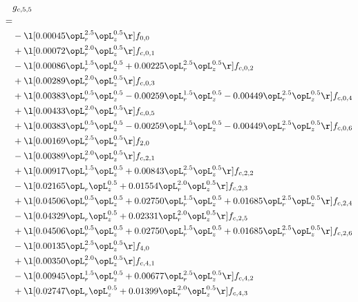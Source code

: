 \begin{alignat}{2} 
\label{eq:g_55_0} 
& g_{c,5,5} \nonumber \\ 
 = \\ 
& - \l[  0.00045 \opL_r^{2.5} \opL_z^{0.5}  \r] f_{0,0} \nonumber \\ 
& + \l[  0.00072 \opL_r^{2.0} \opL_z^{0.5}  \r] f_{c,0,1} \nonumber \\ 
& - \l[  0.00086 \opL_r^{1.5} \opL_z^{0.5} +  0.00225 \opL_r^{2.5} \opL_z^{0.5}  \r] f_{c,0,2} \nonumber \\ 
& + \l[  0.00289 \opL_r^{2.0} \opL_z^{0.5}  \r] f_{c,0,3} \nonumber \\ 
& + \l[  0.00383 \opL_r^{0.5} \opL_z^{0.5}   -0.00259 \opL_r^{1.5} \opL_z^{0.5}   -0.00449 \opL_r^{2.5} \opL_z^{0.5}  \r] f_{c,0,4} \nonumber \\ 
& + \l[  0.00433 \opL_r^{2.0} \opL_z^{0.5}  \r] f_{c,0,5} \nonumber \\ 
& + \l[  0.00383 \opL_r^{0.5} \opL_z^{0.5}   -0.00259 \opL_r^{1.5} \opL_z^{0.5}   -0.00449 \opL_r^{2.5} \opL_z^{0.5}  \r] f_{c,0,6} \nonumber \\ 
& + \l[  0.00169 \opL_r^{2.5} \opL_z^{0.5}  \r] f_{2,0} \nonumber \\ 
& - \l[  0.00389 \opL_r^{2.0} \opL_z^{0.5}  \r] f_{c,2,1} \nonumber \\ 
& + \l[  0.00917 \opL_r^{1.5} \opL_z^{0.5} +  0.00843 \opL_r^{2.5} \opL_z^{0.5}  \r] f_{c,2,2} \nonumber \\ 
& - \l[  0.02165 \opL_r \opL_z^{0.5} +  0.01554 \opL_r^{2.0} \opL_z^{0.5}  \r] f_{c,2,3} \nonumber \\ 
& + \l[  0.04506 \opL_r^{0.5} \opL_z^{0.5} +  0.02750 \opL_r^{1.5} \opL_z^{0.5} +  0.01685 \opL_r^{2.5} \opL_z^{0.5}  \r] f_{c,2,4} \nonumber \\ 
& - \l[  0.04329 \opL_r \opL_z^{0.5} +  0.02331 \opL_r^{2.0} \opL_z^{0.5}  \r] f_{c,2,5} \nonumber \\ 
& + \l[  0.04506 \opL_r^{0.5} \opL_z^{0.5} +  0.02750 \opL_r^{1.5} \opL_z^{0.5} +  0.01685 \opL_r^{2.5} \opL_z^{0.5}  \r] f_{c,2,6} \nonumber \\ 
& - \l[  0.00135 \opL_r^{2.5} \opL_z^{0.5}  \r] f_{4,0} \nonumber \\ 
& + \l[  0.00350 \opL_r^{2.0} \opL_z^{0.5}  \r] f_{c,4,1} \nonumber \\ 
& - \l[  0.00945 \opL_r^{1.5} \opL_z^{0.5} +  0.00677 \opL_r^{2.5} \opL_z^{0.5}  \r] f_{c,4,2} \nonumber \\ 
& + \l[  0.02747 \opL_r \opL_z^{0.5} +  0.01399 \opL_r^{2.0} \opL_z^{0.5}  \r] f_{c,4,3} \nonumber \\ 

\end{alignat}
